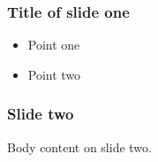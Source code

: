 \documentclass{beamer}
\begin{document}
\begin{frame}
  \frametitle{Title of slide one}
  \begin{itemize}
    \item Point one
    \item Point two
  \end{itemize}
\end{frame}
\begin{frame}[plain]
  \frametitle{Slide two}
  Body content on slide two.
\end{frame}
\end{document}
